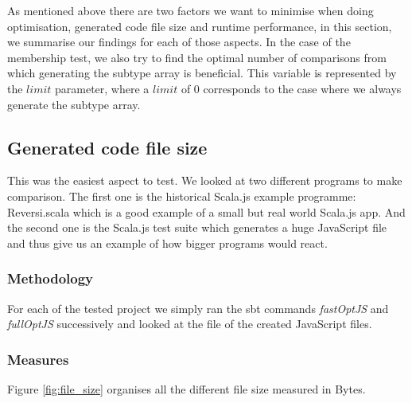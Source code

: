 As mentioned above there are two factors we want to minimise when doing
optimisation, generated code file size and runtime performance, in this
section, we summarise our findings for each of those aspects. In the case of
the membership test, we also try to find the optimal number of comparisons from
which generating the subtype array is beneficial. This variable is represented
by the $limit$ parameter, where a $limit$ of 0 corresponds to the case where we
always generate the subtype array.

\subsection{Generated code file size}
  This was the easiest aspect to test. We looked at two different programs to
make comparison. The first one is the historical Scala.js example programme:
Reversi.scala which is a good example of a small but real world Scala.js app.
And the second one is the Scala.js test suite which generates a huge JavaScript
file and thus give us an example of how bigger programs would react.

\subsubsection{Methodology}
For each of the tested project we simply ran the sbt commands \emph{fastOptJS}
and \emph{fullOptJS} successively and looked at the file of the created
JavaScript files.

\subsubsection{Measures}
Figure \ref{fig:file_size} organises all the different file size measured in
Bytes.

